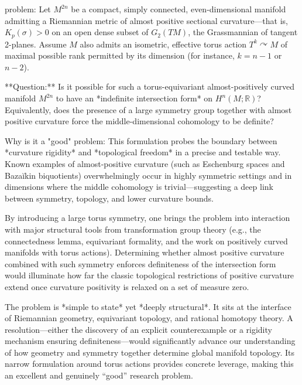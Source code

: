 problem:  
Let \( M^{2n} \) be a compact, simply connected, even-dimensional manifold admitting a Riemannian metric of almost positive sectional curvature—that is, \( K_p(\sigma) > 0 \) on an open dense subset of \( G_2(TM) \), the Grassmannian of tangent 2-planes.  Assume \( M \) also admits an isometric, effective torus action \( T^k \curvearrowright M \) of maximal possible rank permitted by its dimension (for instance, \( k = n - 1 \) or \( n - 2 \)).  

**Question:**  
Is it possible for such a torus-equivariant almost-positively curved manifold \( M^{2n} \) to have an *indefinite intersection form* on \( H^n(M;\mathbb{R}) \)?  Equivalently, does the presence of a large symmetry group together with almost positive curvature force the middle-dimensional cohomology to be definite?  

Why is it a "good" problem:  
This formulation probes the boundary between *curvature rigidity* and *topological freedom* in a precise and testable way.  Known examples of almost-positive curvature (such as Eschenburg spaces and Bazaĭkin biquotients) overwhelmingly occur in highly symmetric settings and in dimensions where the middle cohomology is trivial—suggesting a deep link between symmetry, topology, and lower curvature bounds.  

By introducing a large torus symmetry, one brings the problem into interaction with major structural tools from transformation group theory (e.g., the connectedness lemma, equivariant formality, and the work on positively curved manifolds with torus actions).  Determining whether almost positive curvature combined with such symmetry enforces definiteness of the intersection form would illuminate how far the classic topological restrictions of positive curvature extend once curvature positivity is relaxed on a set of measure zero.  

The problem is *simple to state* yet *deeply structural*.  It sits at the interface of Riemannian geometry, equivariant topology, and rational homotopy theory.  A resolution—either the discovery of an explicit counterexample or a rigidity mechanism ensuring definiteness—would significantly advance our understanding of how geometry and symmetry together determine global manifold topology.  Its narrow formulation around torus actions provides concrete leverage, making this an excellent and genuinely “good” research problem.